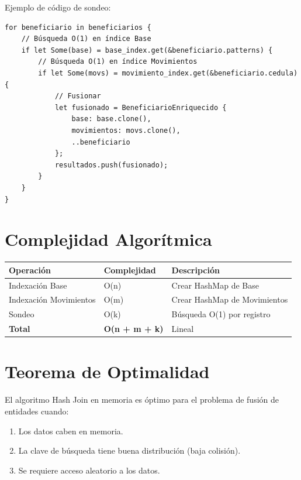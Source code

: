 \bigskip

Ejemplo de código de sondeo:
\begin{verbatim}
for beneficiario in beneficiarios {
    // Búsqueda O(1) en índice Base
    if let Some(base) = base_index.get(&beneficiario.patterns) {
        // Búsqueda O(1) en índice Movimientos
        if let Some(movs) = movimiento_index.get(&beneficiario.cedula) {
            // Fusionar
            let fusionado = BeneficiarioEnriquecido {
                base: base.clone(),
                movimientos: movs.clone(),
                ..beneficiario
            };
            resultados.push(fusionado);
        }
    }
}
\end{verbatim}

\bigskip

\section{Complejidad Algorítmica}

\begin{center}
\begin{tabular}{lll}
\toprule
\textbf{Operación} & \textbf{Complejidad} & \textbf{Descripción} \\
\midrule
Indexación Base & O(n) & Crear HashMap de Base \\
Indexación Movimientos & O(m) & Crear HashMap de Movimientos \\
Sondeo & O(k) & Búsqueda O(1) por registro \\
\midrule
\textbf{Total} & \textbf{O(n + m + k)} & Lineal \\
\bottomrule
\end{tabular}
\end{center}

\bigskip

\section{Teorema de Optimalidad}

El algoritmo Hash Join en memoria es óptimo para el problema de fusión de entidades cuando:

\begin{enumerate}
    \item Los datos caben en memoria.
    \item La clave de búsqueda tiene buena distribución (baja colisión).
    \item Se requiere acceso aleatorio a los datos.
\end{enumerate}

